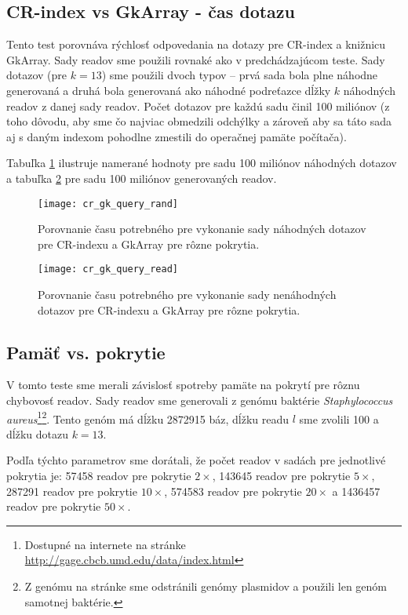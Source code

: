\subsection{CR-index vs GkArray - čas dotazu}
Tento test porovnáva rýchlosť odpovedania na dotazy pre CR-index a knižnicu GkArray. Sady readov sme použili rovnaké ako v predchádzajúcom teste. Sady dotazov (pre $k=13$) sme použili dvoch typov -- prvá sada bola plne náhodne generovaná a druhá bola generovaná ako náhodné podreťazce dĺžky $k$ náhodných readov z danej sady readov. Počet dotazov pre každú sadu činil 100 miliónov (z toho dôvodu, aby sme čo najviac obmedzili odchýlky a zároveň aby sa táto sada aj s daným indexom pohodlne zmestili do operačnej pamäte počítača). 

Tabuľka \ref{fig:graf_cr_gk_query_rand} ilustruje namerané hodnoty pre sadu 100 miliónov náhodných dotazov a tabuľka \ref{fig:graf_cr_gk_query_read} pre sadu 100 miliónov generovaných readov.

\begin{figure}[h]
    \centering
    \texttt{[image: cr\_gk\_query\_rand]}
    \caption{Porovnanie času potrebného pre vykonanie sady náhodných dotazov pre CR-indexu a GkArray pre rôzne pokrytia.}
    \label{fig:graf_cr_gk_query_rand}
\end{figure}

\begin{figure}[h]
    \centering
    \texttt{[image: cr\_gk\_query\_read]}
    \caption{Porovnanie času potrebného pre vykonanie sady nenáhodných dotazov pre CR-indexu a GkArray pre rôzne pokrytia.}
    \label{fig:graf_cr_gk_query_read}
\end{figure}


\clearpage

\subsection{Pamäť vs. pokrytie}
V tomto teste sme merali závislosť spotreby pamäte na pokrytí pre rôznu chybovosť readov. Sady readov sme generovali z genómu baktérie \emph{Staphylococcus aureus}\footnote{Dostupné na internete na stránke \url{http://gage.cbcb.umd.edu/data/index.html}}\footnote{Z genómu na stránke sme odstránili genómy plasmidov a použili len genóm samotnej baktérie.}. Tento genóm má dĺžku 2872915 báz, dĺžku readu $l$ sme zvolili 100 a dĺžku dotazu $k=13$. 

Podľa týchto parametrov sme dorátali, že počet readov v sadách pre jednotlivé pokrytia je: 57458 readov pre pokrytie $2\times$, 143645 readov pre pokrytie $5\times$, 287291 readov pre pokrytie $10\times$, 574583 readov pre pokrytie $20\times$ a 1436457 readov pre pokrytie $50\times$.

